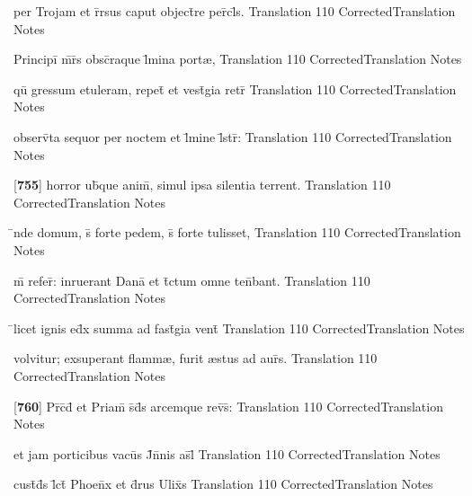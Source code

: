 \latline
  {per Trojam et r\={}rsus caput object\={}re per\={\macron {\i}}cl\={\macron {\i}}s.}
  { Translation }
  {110}
  { CorrectedTranslation }
  { Notes }


\latline
  {Principi\={} m\={}r\={}s obsc\={}raque l\={\macron {\i}}mina port{\ae},}
  { Translation }
  {110}
  { CorrectedTranslation }
  { Notes }


\latline
  {qu\={} gressum etuleram, repet\={} et vest\={\macron {\i}}gia retr\={}}
  { Translation }
  {110}
  { CorrectedTranslation }
  { Notes }


\latline
  {observ\={}ta sequor per noctem et l\={}mine l\={}str\={}:}
  { Translation }
  {110}
  { CorrectedTranslation }
  { Notes }


\latline
  {[\textbf{755}] horror ub\={\macron {\i}}que anim\={}, simul ipsa silentia terrent.}
  { Translation }
  {110}
  { CorrectedTranslation }
  { Notes }


\latline
  {\={}nde domum, s\={\macron {\i}} forte pedem, s\={\macron {\i}} forte tulisset,}
  { Translation }
  {110}
  { CorrectedTranslation }
  { Notes }


\latline
  {m\={} refer\={}: inruerant Dana\={\macron {\i}} et t\={}ctum omne ten\={}bant.}
  { Translation }
  {110}
  { CorrectedTranslation }
  { Notes }


\latline
  {\={}licet ignis ed\={}x summa ad fast\={\macron {\i}}gia vent\={}}
  { Translation }
  {110}
  { CorrectedTranslation }
  { Notes }


\latline
  {volvitur; exsuperant flamm{\ae}, furit {\ae}stus ad aur\={}s.}
  { Translation }
  {110}
  { CorrectedTranslation }
  { Notes }


\latline
  {[\textbf{760}] Pr\={}c\={}d\={} et Priam\={\macron {\i}} s\={}d\={}s arcemque rev\={\macron {\i}}s\={}:}
  { Translation }
  {110}
  { CorrectedTranslation }
  { Notes }


\latline
  {et jam porticibus vacu\={\macron {\i}}s J\={}n\={}nis as\={}l\={}}
  { Translation }
  {110}
  { CorrectedTranslation }
  { Notes }


\latline
  {cust\={}d\={}s l\={}ct\={\macron {\i}} Phoen\={\macron {\i}}x et d\={\macron {\i}}rus Ulix\={}s}
  { Translation }
  {110}
  { CorrectedTranslation }
  { Notes }


